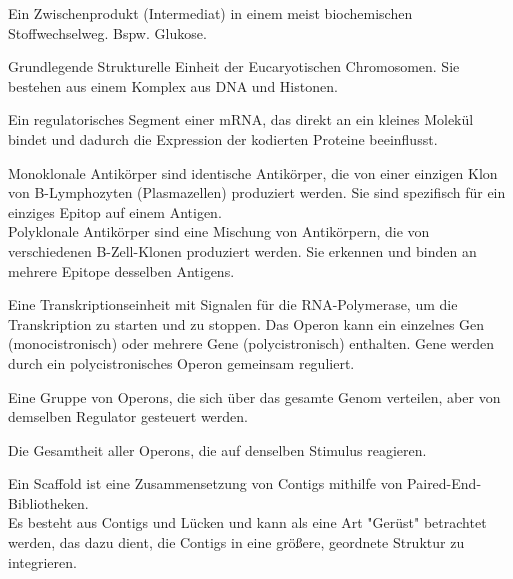 Ein Zwischenprodukt (Intermediat) in einem meist biochemischen Stoffwechselweg. Bspw. Glukose.  \\ \newline

Grundlegende Strukturelle Einheit der Eucaryotischen Chromosomen. Sie bestehen aus einem Komplex aus DNA und Histonen. \\ \newline

Ein regulatorisches Segment einer mRNA, das direkt an ein kleines Molekül bindet und dadurch die Expression der kodierten Proteine beeinflusst. \\ \newline

Monoklonale Antikörper sind identische Antikörper, die von einer einzigen Klon von B-Lymphozyten (Plasmazellen) produziert werden. Sie sind spezifisch für ein einziges Epitop auf einem Antigen.\\ Polyklonale Antikörper sind eine Mischung von Antikörpern, die von verschiedenen B-Zell-Klonen produziert werden. Sie erkennen und binden an mehrere Epitope desselben Antigens.  \\ \newline


Eine \gls{Transkriptionseinheit} mit Signalen für die RNA-Polymerase, um die Transkription zu starten und zu stoppen. Das Operon kann ein einzelnes Gen (monocistronisch) oder mehrere Gene (polycistronisch) enthalten. Gene werden durch ein polycistronisches Operon gemeinsam reguliert.  \\ \newline

Eine Gruppe von Operons, die sich über das gesamte Genom verteilen, aber von demselben Regulator gesteuert werden.  \\ \newline

Die Gesamtheit aller Operons, die auf denselben Stimulus reagieren. \\ \newline

Ein Scaffold ist eine Zusammensetzung von Contigs mithilfe von Paired-End-Bibliotheken. \\ 
\noindent Es besteht aus Contigs und Lücken und kann als eine Art "Gerüst" betrachtet werden, das dazu dient, die Contigs in eine größere, geordnete Struktur zu integrieren.  \\ \newline

